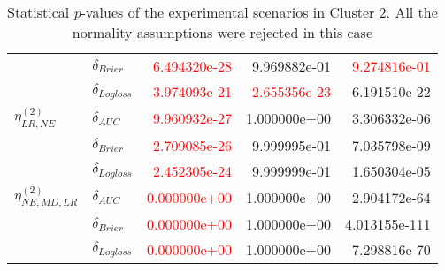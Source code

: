 \begin{table}[!h]
\begin{tabular}{l|lrrr}
                             & $\delta_{Brier}$ &  \textcolor{red}{6.494320e-28} &  9.969882e-01 &   \textcolor{red}{9.274816e-01} \\
                             & $\delta_{Logloss}$ &  \textcolor{red}{3.974093e-21} &  \textcolor{red}{2.655356e-23} &   6.191510e-22 \\
                             \hline
        $\eta^{(2)}_{LR, NE}$ & $\delta_{AUC}$ &  \textcolor{red}{9.960932e-27} &  1.000000e+00 &   3.306332e-06 \\
                             & $\delta_{Brier}$ &  \textcolor{red}{2.709085e-26} &  9.999995e-01 &   7.035798e-09 \\
                             & $\delta_{Logloss}$ &  \textcolor{red}{2.452305e-24} &  9.999999e-01 &   1.650304e-05 \\
                             \hline
        $\eta^{(2)}_{NE, MD, LR}$ & $\delta_{AUC}$ &  \textcolor{red}{0.000000e+00} &  1.000000e+00 &   2.904172e-64 \\
                             & $\delta_{Brier}$ &  \textcolor{red}{0.000000e+00} &  1.000000e+00 &  4.013155e-111 \\
                             & $\delta_{Logloss}$ &  \textcolor{red}{0.000000e+00} &  1.000000e+00 &   7.298816e-70 \\
        \bottomrule
\end{tabular}        
\caption{Statistical $p$-values of the experimental scenarios in Cluster 2. All the normality assumptions were rejected in this case}
\label{table:result-cluster2}
\end{table}
